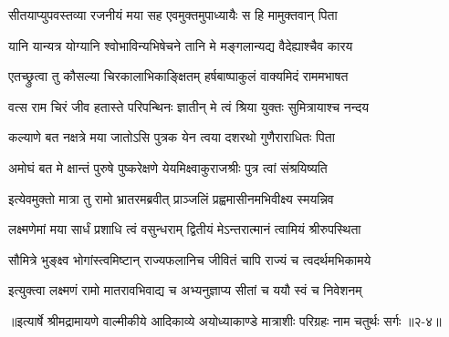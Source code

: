 \twolineshloka
{सीतयाप्युपवस्तव्या रजनीयं मया सह}
{एवमुक्तमुपाध्यायैः स हि मामुक्तवान् पिता} %

\twolineshloka
{यानि यान्यत्र योग्यानि श्वोभाविन्यभिषेचने}
{तानि मे मङ्गलान्यद्य वैदेह्याश्चैव कारय} %

\twolineshloka
{एतच्छ्रुत्वा तु कौसल्या चिरकालाभिकाङ्क्षितम्}
{हर्षबाष्पाकुलं वाक्यमिदं राममभाषत} %

\twolineshloka
{वत्स राम चिरं जीव हतास्ते परिपन्थिनः}
{ज्ञातीन् मे त्वं श्रिया युक्तः सुमित्रायाश्च नन्दय} %

\twolineshloka
{कल्याणे बत नक्षत्रे मया जातोऽसि पुत्रक}
{येन त्वया दशरथो गुणैराराधितः पिता} %

\twolineshloka
{अमोघं बत मे क्षान्तं पुरुषे पुष्करेक्षणे}
{येयमिक्ष्वाकुराजश्रीः पुत्र त्वां संश्रयिष्यति} %

\twolineshloka
{इत्येवमुक्तो मात्रा तु रामो भ्रातरमब्रवीत्}
{प्राञ्जलिं प्रह्वमासीनमभिवीक्ष्य स्मयन्निव} %

\twolineshloka
{लक्ष्मणेमां मया सार्धं प्रशाधि त्वं वसुन्धराम्}
{द्वितीयं मेऽन्तरात्मानं त्वामियं श्रीरुपस्थिता} %

\twolineshloka
{सौमित्रे भुङ्क्ष्व भोगांस्त्वमिष्टान् राज्यफलानिच}
{जीवितं चापि राज्यं च त्वदर्थमभिकामये} %

\twolineshloka
{इत्युक्त्वा लक्ष्मणं रामो मातरावभिवाद्य च}
{अभ्यनुज्ञाप्य सीतां च ययौ स्वं च निवेशनम्} %


॥इत्यार्षे श्रीमद्रामायणे वाल्मीकीये आदिकाव्ये अयोध्याकाण्डे मात्राशीः परिग्रहः नाम चतुर्थः सर्गः ॥२-४॥
